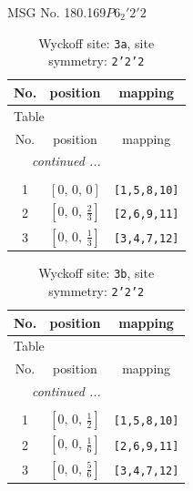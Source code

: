 \documentclass[fleqn,8pt]{jsarticle}
\begin{document}
\setcounter{MaxMatrixCols}{32}

\renewcommand{\tablename}{Table~}
\renewcommand{\figurename}{Figure~}
\begin{center}
\LARGE
MSG No. 180.169\quad$P6_{2}'2'2$
\end{center}
\renewcommand{\arraystretch}{1.2}
\begin{longtable}{ccc}
\caption{Wyckoff site: {\tt 3a}, site symmetry: {\tt 2'2'2}}
 \\
 \hline \hline
No. & position & mapping \\ \hline \endfirsthead

\multicolumn{2}{l}{\tablename\ \thetable{}} \\
 \hline \hline
No. & position & mapping \\ \hline \endhead

 \hline \hline
\multicolumn{2}{r}{\footnotesize\it continued ...} \\ \endfoot

 \hline \hline
\multicolumn{2}{r}{} \\ \endlastfoot

1 & $\left[ 0,\, 0,\, 0 \right]$ & {\tt [1,5,8,10]} \\ \hline
2 & $\left[ 0,\, 0,\, \frac{2}{3} \right]$ & {\tt [2,6,9,11]} \\ \hline
3 & $\left[ 0,\, 0,\, \frac{1}{3} \right]$ & {\tt [3,4,7,12]} \\
\end{longtable}
\renewcommand{\arraystretch}{1.2}
\begin{longtable}{ccc}
\caption{Wyckoff site: {\tt 3b}, site symmetry: {\tt 2'2'2}}
 \\
 \hline \hline
No. & position & mapping \\ \hline \endfirsthead

\multicolumn{2}{l}{\tablename\ \thetable{}} \\
 \hline \hline
No. & position & mapping \\ \hline \endhead

 \hline \hline
\multicolumn{2}{r}{\footnotesize\it continued ...} \\ \endfoot

 \hline \hline
\multicolumn{2}{r}{} \\ \endlastfoot

1 & $\left[ 0,\, 0,\, \frac{1}{2} \right]$ & {\tt [1,5,8,10]} \\ \hline
2 & $\left[ 0,\, 0,\, \frac{1}{6} \right]$ & {\tt [2,6,9,11]} \\ \hline
3 & $\left[ 0,\, 0,\, \frac{5}{6} \right]$ & {\tt [3,4,7,12]} \\
\end{longtable}
\end{document}
